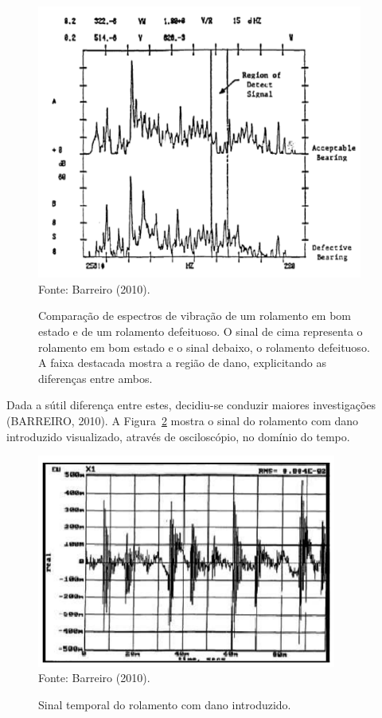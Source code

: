 \documentclass[
	12pt,				
	oneside,			
	a4paper,			
	english,			
	brazil,	
	sumario=abnt-6027-2012		
	]{abntex2ppgsi}
\begin{document}
\begin{figure}[H]
\centering
\caption {Comparação de espectros de vibração de um rolamento em bom estado e de um rolamento defeituoso. O sinal de cima representa o rolamento em bom estado e o sinal debaixo, o rolamento defeituoso. A faixa destacada mostra a região de dano, explicitando as diferenças entre ambos.}
\includegraphics[width=\textwidth,height=90mm,keepaspectratio]{fft_sinal_barreiro} \\
Fonte: Barreiro (2010).
\label{fft_sinal_barreiro}
\end{figure}

Dada a sútil diferença entre estes, decidiu-se conduzir maiores investigações (BARREIRO, 2010). A Figura~\ref{sinal_temporal_rolamento_barreiro} mostra o sinal do rolamento com dano introduzido visualizado, através de osciloscópio, no domínio do tempo.

\begin{figure}[H]
\centering
\caption {Sinal temporal do rolamento com dano introduzido.}
\includegraphics[width=\textwidth,height=70mm,keepaspectratio]{sinal_temporal_rolamento_barreiro} \\
Fonte: Barreiro (2010).
\label{sinal_temporal_rolamento_barreiro}
\end{figure}
\end{document}
